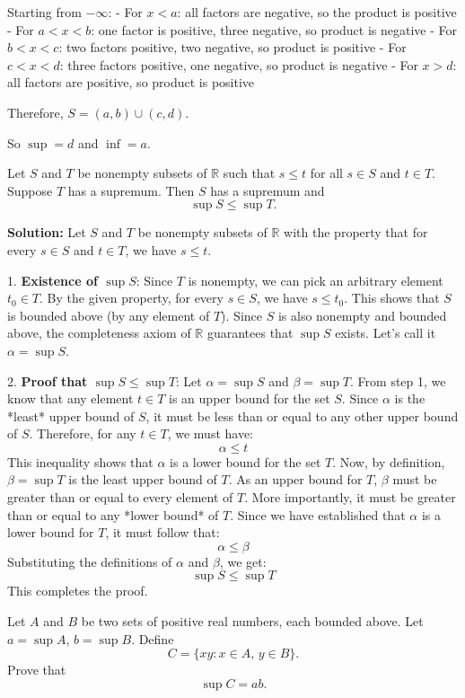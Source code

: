 Starting from $-\infty$:
- For $x < a$: all factors are negative, so the product is positive
- For $a < x < b$: one factor is positive, three negative, so product is negative
- For $b < x < c$: two factors positive, two negative, so product is positive
- For $c < x < d$: three factors positive, one negative, so product is negative
- For $x > d$: all factors are positive, so product is positive

Therefore, $S = (a, b) \cup (c, d)$.

So $\sup = d$ and $\inf = a$.

\begin{problembox}
Let \( S \) and \( T \) be nonempty subsets of \( \mathbb{R} \) such that \( s \leq t \) for all \( s \in S \) and \( t \in T \). Suppose \( T \) has a supremum. Then \( S \) has a supremum and
\[
\sup S \leq \sup T.
\]
\end{problembox}

\textbf{Solution:}
Let $S$ and $T$ be nonempty subsets of $\mathbb{R}$ with the property that for every $s \in S$ and $t \in T$, we have $s \leq t$.

1.  \textbf{Existence of $\sup S$}:
Since $T$ is nonempty, we can pick an arbitrary element $t_0 \in T$. By the given property, for every $s \in S$, we have $s \leq t_0$. This shows that $S$ is bounded above (by any element of $T$). Since $S$ is also nonempty and bounded above, the completeness axiom of $\mathbb{R}$ guarantees that $\sup S$ exists. Let's call it $\alpha = \sup S$.

2.  \textbf{Proof that $\sup S \leq \sup T$}:
Let $\alpha = \sup S$ and $\beta = \sup T$.
From step 1, we know that any element $t \in T$ is an upper bound for the set $S$.
Since $\alpha$ is the *least* upper bound of $S$, it must be less than or equal to any other upper bound of $S$. Therefore, for any $t \in T$, we must have:
\[
\alpha \leq t
\]
This inequality shows that $\alpha$ is a lower bound for the set $T$.
Now, by definition, $\beta = \sup T$ is the least upper bound of $T$. As an upper bound for $T$, $\beta$ must be greater than or equal to every element of $T$. More importantly, it must be greater than or equal to any *lower bound* of $T$.
Since we have established that $\alpha$ is a lower bound for $T$, it must follow that:
\[
\alpha \leq \beta
\]
Substituting the definitions of $\alpha$ and $\beta$, we get:
\[
\sup S \leq \sup T
\]
This completes the proof.

\begin{problembox}
Let \( A \) and \( B \) be two sets of positive real numbers, each bounded above. Let \( a = \sup A \), \( b = \sup B \). Define
\[
C = \{ xy : x \in A,\, y \in B \}.
\]
Prove that
\[
\sup C = ab.
\]
\end{problembox}

